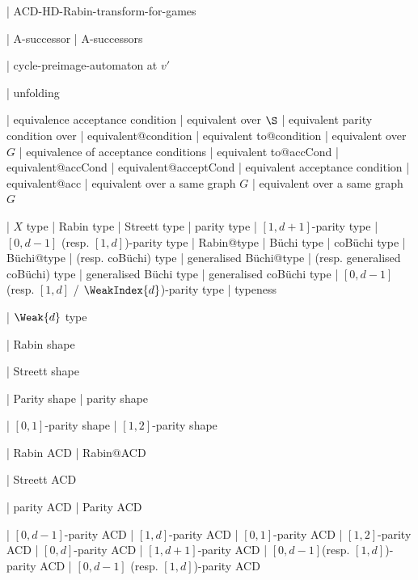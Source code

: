   | ACD-HD-Rabin-transform-for-games
  
| A-successor
| A-successors


  | cycle-preimage-automaton at $v'$

  | unfolding



  
| equivalence acceptance condition
| equivalent over $\S $
| equivalent parity condition over
| equivalent@condition
| equivalent to@condition
| equivalent over $G$
| equivalence of acceptance conditions
| equivalent to@accCond
| equivalent@accCond
| equivalent@acceptCond
| equivalent acceptance condition
| equivalent@acc
| equivalent over a same graph $G$
| equivalent over a same graph~$G$




  | $X$ type
  | Rabin type
  | Streett type
  | parity type
  | $[1,d+1]$-parity type
  | $[0,d-1]$ (resp. $[1,d]$)-parity type
  | Rabin@type
  | B\"uchi type
  | coB\"uchi type
  | B\"uchi@type
  | (resp. coB\"uchi) type
  | generalised B\"uchi@type
  | (resp. generalised coB\"uchi) type
  | generalised B\"uchi type
  | generalised coB\"uchi type
  | $[0,d-1]$ (resp. $[1,d]$ / $\WeakIndex {d}$)-parity type
  | typeness
  
| $\Weak {d}$ type

  | Rabin shape

  | Streett shape

  | Parity shape
  | parity shape
  
  | $[0,1]$-parity shape
  | $[1,2]$-parity shape

  | Rabin ACD
  | Rabin@ACD
  
  | Streett ACD

  | parity ACD
  | Parity ACD 

  | $[0,d-1]$-parity ACD
  | $[1,d]$-parity ACD
  | $[0,1]$-parity ACD
  | $[1,2]$-parity ACD
  | $[0,d]$-parity ACD
  | $[1,d+1]$-parity ACD
  | $[0,d-1]$(resp. $[1,d]$)-parity ACD
  | $[0,d-1]$ (resp. $[1,d]$)-parity ACD





